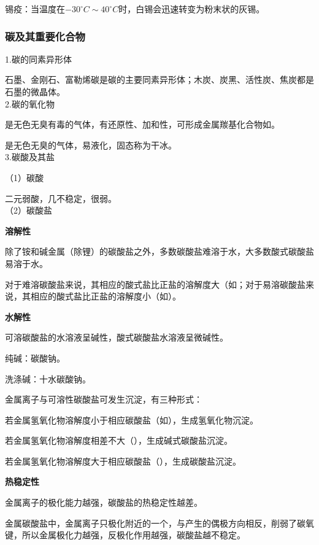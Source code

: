 \documentclass[a4paper,UTF8]{article}
\begin{document}
锡疫：当温度在$ -30^\circ C \sim 40^\circ C $时，白锡会迅速转变为粉末状的灰锡。

\subsubsection{碳及其重要化合物}

1.碳的同素异形体

石墨、金刚石、富勒烯碳是碳的主要同素异形体；木炭、炭黑、活性炭、焦炭都是石墨的微晶体。\\

2.碳的氧化物

是无色无臭有毒的气体，有还原性、加和性，可形成金属羰基化合物如\ce{[Ni(CO)4]}。

是无色无臭的气体，易液化，固态称为干冰。\\

3.碳酸及其盐

（1）碳酸

二元弱酸，几不稳定，很弱。\\

（2）碳酸盐

\textbf{溶解性}

除了铵和碱金属（除锂）的碳酸盐之外，多数碳酸盐难溶于水，大多数酸式碳酸盐易溶于水。

对于难溶碳酸盐来说，其相应的酸式盐比正盐的溶解度大（如；对于易溶碳酸盐来说，其相应的酸式盐比正盐的溶解度小（如）。

\textbf{水解性}

可溶碳酸盐的水溶液呈碱性，酸式碳酸盐水溶液呈微碱性。

纯碱：碳酸钠。

洗涤碱：十水碳酸钠。

金属离子与可溶性碳酸盐可发生沉淀，有三种形式：

若金属氢氧化物溶解度小于相应碳酸盐（如），生成氢氧化物沉淀。

若金属氢氧化物溶解度相差不大（），生成碱式碳酸盐沉淀。

若金属氢氧化物溶解度大于相应碳酸盐（），生成碳酸盐沉淀。

\textbf{热稳定性}

金属离子的极化能力越强，碳酸盐的热稳定性越差。


金属碳酸盐中，金属离子只极化附近的一个，与产生的偶极方向相反，削弱了碳氧键，所以金属极化力越强，反极化作用越强，碳酸盐越不稳定。
\end{document}
